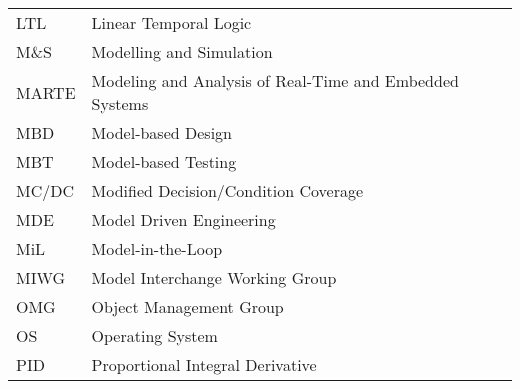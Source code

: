 \begin{longtable}{ll}
LTL & Linear Temporal Logic \\
M\&S    &Modelling and Simulation\\
MARTE & Modeling and Analysis of Real-Time and Embedded Systems\\
MBD     &Model-based Design\\
MBT & Model-based Testing\\
MC/DC   &Modified Decision/Condition Coverage\\
MDE & Model Driven Engineering \\
MiL 	&Model-in-the-Loop\\
MIWG & Model Interchange Working Group\\
OMG     &Object Management Group\\
OS	&Operating System\\
PID     &Proportional Integral Derivative \\

\end{longtable}
